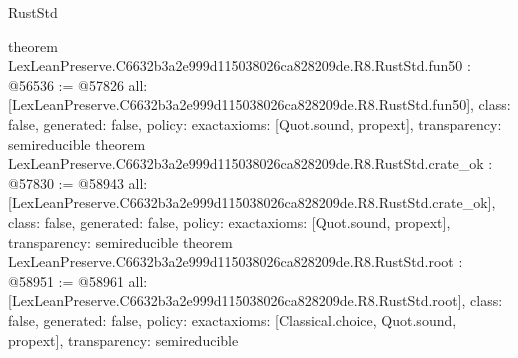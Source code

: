 \begin{lexlean}{RustStd}
\begin{coremodule}
{}
theorem LexLeanPreserve.C6632b3a2e999d115038026ca828209de.R8.RustStd.fun50 : @56536 := @57826 {
  all: [LexLeanPreserve.C6632b3a2e999d115038026ca828209de.R8.RustStd.fun50],
  class: false,
  generated: false,
  policy: exact{axioms: [Quot.sound, propext]},
  transparency: semireducible
}
theorem LexLeanPreserve.C6632b3a2e999d115038026ca828209de.R8.RustStd.crate_ok : @57830 := @58943 {
  all: [LexLeanPreserve.C6632b3a2e999d115038026ca828209de.R8.RustStd.crate_ok],
  class: false,
  generated: false,
  policy: exact{axioms: [Quot.sound, propext]},
  transparency: semireducible
}
theorem LexLeanPreserve.C6632b3a2e999d115038026ca828209de.R8.RustStd.root : @58951 := @58961 {
  all: [LexLeanPreserve.C6632b3a2e999d115038026ca828209de.R8.RustStd.root],
  class: false,
  generated: false,
  policy: exact{axioms: [Classical.choice, Quot.sound, propext]},
  transparency: semireducible
}


\end{coremodule}
\end{lexlean}
